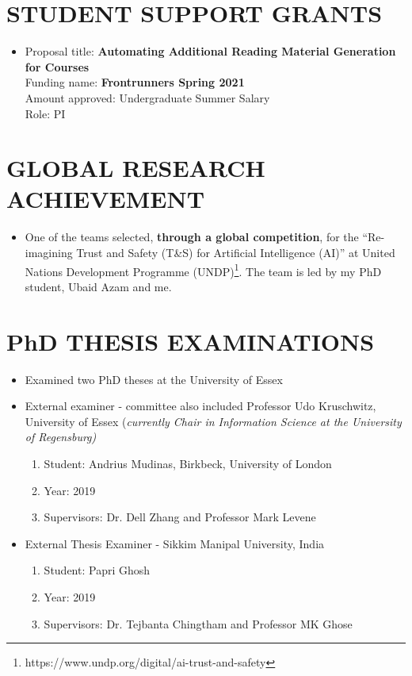 \documentclass[margin]{res}
\begin{document}
\begin{resume}
\section{STUDENT SUPPORT GRANTS}
\begin{itemize}
    \item Proposal title: \textbf{Automating Additional Reading Material Generation for Courses} \\
    Funding name: \textbf{Frontrunners Spring 2021} \\
    Amount approved: Undergraduate Summer Salary \\
    Role: PI
\end{itemize}

\section{GLOBAL RESEARCH ACHIEVEMENT}
\begin{itemize}
    \item One of the teams selected, \textbf{through a global competition}, for the ``Re-imagining Trust and Safety (T\&S) for Artificial Intelligence (AI)'' at United Nations Development Programme (UNDP)\footnote{https://www.undp.org/digital/ai-trust-and-safety}. The team is led by my PhD student, Ubaid Azam and me.
\end{itemize}


\section{PhD THESIS EXAMINATIONS}
\begin{itemize}
    \item Examined two PhD theses at the University of Essex
\end{itemize}
\begin{itemize}
    \item External examiner - committee also included Professor Udo Kruschwitz, University of Essex (\textit{currently Chair in Information Science at the University of Regensburg)}
    \begin{enumerate}
        \item Student: Andrius Mudinas, Birkbeck, University of London
        \item Year: 2019
        \item Supervisors: Dr. Dell Zhang and Professor Mark Levene 
    \end{enumerate}
    \item External Thesis Examiner - Sikkim Manipal University, India
    \begin{enumerate}
        \item Student: Papri Ghosh
        \item Year: 2019
        \item Supervisors: Dr. Tejbanta Chingtham and Professor MK Ghose
    \end{enumerate}
\end{itemize}


\end{resume}
\end{document}

